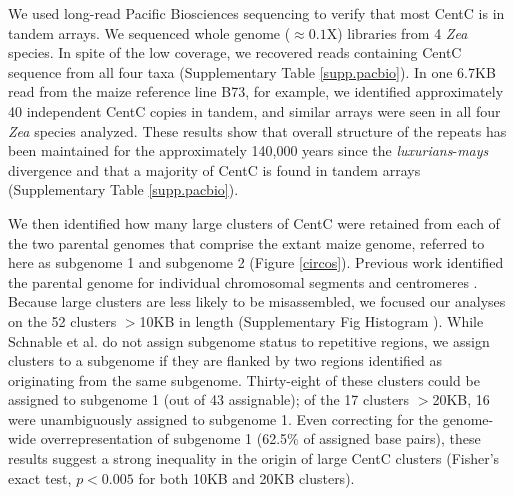 We used long-read Pacific Biosciences sequencing to verify that most CentC is in tandem arrays. We sequenced whole genome ($\approx 0.1$X) libraries from 4 \emph{Zea} species.  In spite of the low coverage, we recovered reads containing CentC sequence from all four taxa (Supplementary Table \ref{supp.pacbio}).  In one 6.7KB read from the maize reference line B73, for example, we identified approximately 40 independent CentC copies in tandem, and similar arrays were seen in all four \emph{Zea} species analyzed.  These results show that overall structure of the repeats has been maintained for the approximately 140,000 years since the \emph{luxurians}-\emph{mays} divergence \citep{Hanson1996,  Ross-Ibarra2009} and that a majority of CentC is found in tandem arrays (Supplementary Table \ref{supp.pacbio}).

We then identified how many large clusters of CentC were retained from each of the two parental genomes that comprise the extant maize genome, referred to here as subgenome 1 and subgenome 2 (Figure \ref{circos}).  Previous work identified the parental genome for individual chromosomal segments \citep{Schnable2011} and centromeres \citep{Wang2012}.  Because large clusters are less likely to be misassembled, we focused our analyses on the 52 clusters $>$10KB in length (Supplementary Fig Histogram ).  While Schnable et al. \citet{Schnable2010} do not assign subgenome status to repetitive regions, we assign clusters to a subgenome if they are flanked by two regions identified as originating from the same  subgenome.  Thirty-eight of these clusters could be assigned to subgenome 1 (out of 43 assignable); of the 17 clusters $>$20KB, 16 were unambiguously assigned to subgenome 1.  Even correcting for the genome-wide overrepresentation of subgenome 1 (62.5\% of assigned base pairs), these results suggest a strong inequality in the origin of large CentC clusters (Fisher's exact test, $p<0.005$ for both 10KB and 20KB clusters).

